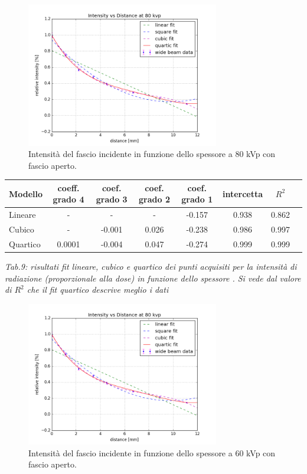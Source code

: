 \documentclass[a4paper]{article}
\begin{document}
\begin{figure}[H]
\centering
\includegraphics[width=0.75\textwidth]{hvl80kvpwide.png}
\caption{Intensità del fascio incidente in funzione dello spessore a 80 kVp con fascio aperto.}
\end{figure}

\begin{center} 
		
		\begin{tabular}{lccccccc}
			\hline
			\hline
			\textbf{Modello}	& \textbf{coeff. grado 4}&\textbf{coef. grado 3}&\textbf{coef. grado 2}& \textbf{coef. grado 1}& \textbf{intercetta}&  \textbf{$R^{2}$} 	 \\
			\hline
			\hline
			Lineare	&-&-&-&-0.157&0.938&0.862	\\
			Cubico	&-&-0.001&0.026&-0.238&0.986&0.997\\
			Quartico &0.0001&-0.004&0.047&-0.274&0.999&0.999\\
			
			\hline
			\hline
		\end{tabular}
		\linebreak
		\emph{Tab.9: risultati fit lineare, cubico e quartico  dei punti acquisiti per la intensità di radiazione (proporzionale alla dose) in funzione dello spessore . Si vede dal valore di $R^{2}$ che il fit quartico descrive meglio i dati} 
	\end{center} 




\begin{figure}[H]
\centering
\includegraphics[width=0.75\textwidth]{hvl80kvpwide.png}
\caption{Intensità del fascio incidente in funzione dello spessore a 60 kVp con fascio aperto.}
\end{figure}
\end{document}
